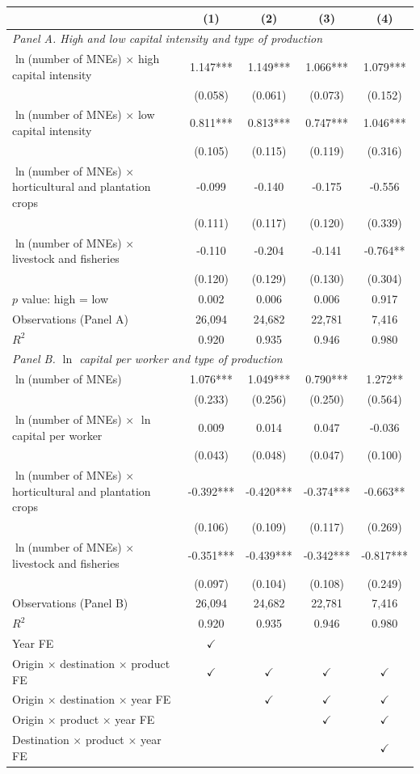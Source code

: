 \begin{tabular}{l*{4}{c}}
\toprule
 & (1) & (2) & (3) & (4) \\
\midrule
\multicolumn{5}{l}{\textit{Panel A. High and low capital intensity and type of production}} \\
$\ln$(number of MNEs) $\times$ high capital intensity & 1.147*** & 1.149*** & 1.066*** & 1.079*** \\
 & (0.058) & (0.061) & (0.073) & (0.152) \\
$\ln$(number of MNEs) $\times$ low capital intensity & 0.811*** & 0.813*** & 0.747*** & 1.046*** \\
 & (0.105) & (0.115) & (0.119) & (0.316) \\
$\ln$(number of MNEs) $\times$ horticultural and plantation crops & -0.099 & -0.140 & -0.175 & -0.556 \\
 & (0.111) & (0.117) & (0.120) & (0.339) \\
$\ln$(number of MNEs) $\times$ livestock and fisheries & -0.110 & -0.204 & -0.141 & -0.764** \\
 & (0.120) & (0.129) & (0.130) & (0.304) \\
$p$ value: high = low & 0.002 & 0.006 & 0.006 & 0.917 \\
Observations (Panel A) & 26,094 & 24,682 & 22,781 & 7,416 \\
$R^2$ & 0.920 & 0.935 & 0.946 & 0.980 \\
\midrule
\multicolumn{5}{l}{\textit{Panel B. $\ln$ capital per worker and type of production}} \\
$\ln$(number of MNEs) & 1.076*** & 1.049*** & 0.790*** & 1.272** \\
 & (0.233) & (0.256) & (0.250) & (0.564) \\
$\ln$(number of MNEs) $\times$ $\ln$ capital per worker & 0.009 & 0.014 & 0.047 & -0.036 \\
 & (0.043) & (0.048) & (0.047) & (0.100) \\
$\ln$(number of MNEs) $\times$ horticultural and plantation crops & -0.392*** & -0.420*** & -0.374*** & -0.663** \\
 & (0.106) & (0.109) & (0.117) & (0.269) \\
$\ln$(number of MNEs) $\times$ livestock and fisheries & -0.351*** & -0.439*** & -0.342*** & -0.817*** \\
 & (0.097) & (0.104) & (0.108) & (0.249) \\
Observations (Panel B) & 26,094 & 24,682 & 22,781 & 7,416 \\
$R^2$ & 0.920 & 0.935 & 0.946 & 0.980 \\
\midrule
Year FE & $\checkmark$ &  &  &  \\
Origin $\times$ destination $\times$ product FE & $\checkmark$ & $\checkmark$ & $\checkmark$ & $\checkmark$ \\
Origin $\times$ destination $\times$ year FE &  & $\checkmark$ & $\checkmark$ & $\checkmark$ \\
Origin $\times$ product $\times$ year FE &  &  & $\checkmark$ & $\checkmark$ \\
Destination $\times$ product $\times$ year FE &  &  &  & $\checkmark$ \\
\bottomrule
\end{tabular}
